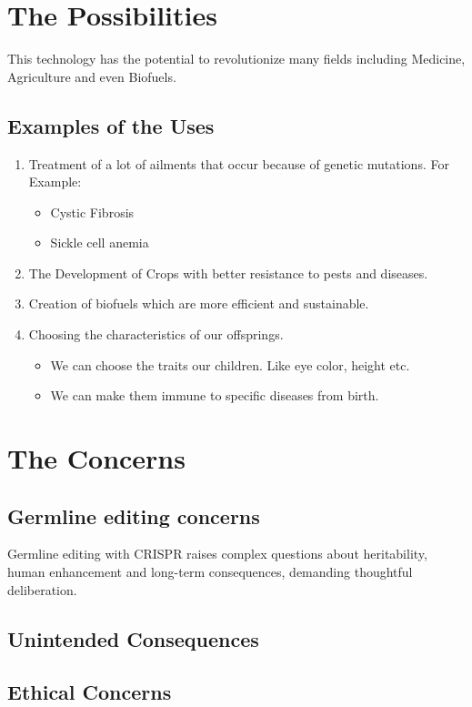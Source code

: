 \documentclass[a4paper,12pt]{article}
\begin{document}
  \section{The Possibilities}
  This technology has the potential to revolutionize many fields including Medicine, Agriculture and even Biofuels.
  \subsection{Examples of the Uses}
  \begin{enumerate}
    \item Treatment of a lot of ailments that occur because of genetic mutations. For Example:
      \begin{itemize}
        \item Cystic Fibrosis
        \item Sickle cell anemia
      \end{itemize}
    \item The Development of Crops with better resistance to pests and diseases.
    \item Creation of biofuels which are more efficient and sustainable.
    \item Choosing the characteristics of our offsprings.
      \begin{itemize}
        \item We can choose the traits our children. Like eye color, height etc.
        \item We can make them immune to specific diseases from birth. 
      \end{itemize}
  \end{enumerate}
  \section{The Concerns}
  \subsection{Germline editing concerns}
  Germline editing with CRISPR raises complex questions about heritability, human enhancement and long-term consequences, demanding thoughtful deliberation.
  \subsection{Unintended Consequences}
  \subsection{Ethical Concerns}
\end{document}
